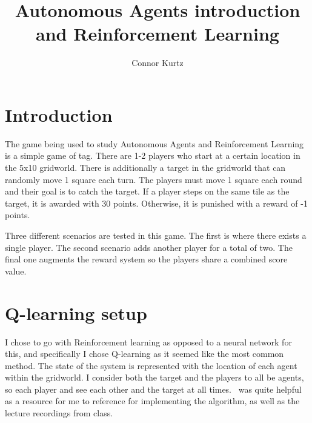 \documentclass[sigconf]{aamas}
\title[Multiagent Systems: Homework 2]{Autonomous Agents introduction and Reinforcement Learning}
\author{Connor Kurtz}
\affiliation{
  \institution{Oregon State University}
  \city{Corvallis, OR}}
\begin{document}

\pagestyle{fancy}
\fancyhead{}


\maketitle 


\section{Introduction}
The game being used to study Autonomous Agents and Reinforcement Learning
is a simple game of tag. There are 1-2 players who start at a certain
location in the 5x10 gridworld. There is additionally a target in the 
gridworld that can randomly move 1 square each turn. The players must 
move 1 square each round and their goal is to catch the target. If a
player steps on the same tile as the target, it is awarded with 30 points.
Otherwise, it is punished with a reward of -1 points. 

Three different scenarios are tested in this game. The first is where there 
exists a single player. The second scenario adds another player for a
total of two. The final one augments the reward system so the players share
a combined score value.



\section{Q-learning setup}

I chose to go with Reinforcement learning as opposed to a neural 
network for this, and specifically I chose Q-learning as it seemed 
like the most common method. The state of the system is represented 
with the location of each agent within the gridworld. I consider both
the target and the players to all be agents, so each player and see 
each other and the target at all times. \cite{SimpleQlearning}~was quite
helpful as a resource for me to reference for implementing the algorithm,
as well as the lecture recordings from class.
\end{document}
